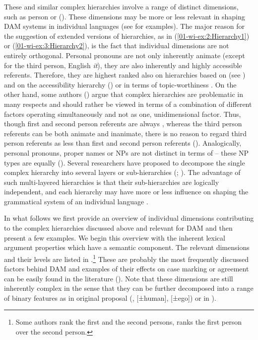 \documentclass[output=paper]{LSP/langsci}
\begin{document}
\noindent These and similar complex hierarchies involve a range of distinct dimensions, such as \eg person or  (\cf \citealt[130]{Croft2003Typology}). 
These dimensions may be more or less relevant in shaping DAM systems in individual languages (see \citealt{Aissen1999Markedness} for examples). 
The major reason for the suggestion of extended versions of hierarchies, as in (\ref{01-wi-ex:2:Hierarchy1}) or (\ref{01-wi-ex:3:Hierarchy2}), is the fact that individual dimensions are not entirely orthogonal. 
Personal pronouns are not only inherently animate (except for the third person, \cf English \textit{it}), they are also inherently  and highly accessible referents. Therefore, they are highest ranked also on hierarchies based on  (see ) and on the accessibility hierarchy (\cf \citealt{Ariel1988Referring, Ariel2001Accessibility}) or in terms of topic-worthiness \citep{Wierzbicka1981Case}. 
On the other hand, some authors (\eg \citealt{Dahl2008Animacy}) argue that complex hierarchies are problematic in many respects and should rather be viewed in terms of a combination of different factors operating simultaneously and not as one, unidimensional factor. 
Thus, though first and second person referents are always , whereas the third person referents can be both animate and inanimate, there is no reason to regard  third person referents as less  than first and second person referents (\cf \citealt[195]{Comrie1989Language}). 
Analogically, personal pronouns, proper names or  NPs are not distinct in terms of  – these NP types are equally  (\cf \citealt[45]{vonHeusingeretal2003Interaction}). 
Several researchers have proposed to decompose the single complex hierarchy into several layers or sub-hierarchies (\cf \citealt[130]{Croft2003Typology}; \citealt[149]{Siewierska2004Person}). 
The advantage of such multi-layered hierarchies is that their sub-hierarchies are logically independent, and each hierarchy may have more or less influence on shaping the grammatical system of an individual language \citep{Haudeetal2016Referential}. 

In what follows we first provide an overview of individual dimensions contributing to the complex hierarchies discussed above and relevant for DAM and then present a few examples. 
We begin this overview with the inherent lexical argument properties which have a semantic component. The relevant dimensions and their levels are listed in .\footnote{Some authors rank the first and the second persons, \eg \citet[85]{Dixon1979Ergativity} ranks the first person over the second person.} 
These are probably the most frequently discussed factors behind DAM and examples of their effects on case marking or agreement can be easily found in the literature (\eg \citealt{Silverstein1976Hierarchy, Aissen1999Markedness, Dixon1994Ergativity}). 
Note that these dimensions are still inherently complex in the sense that they can be further decomposed into a range of binary features as in  original proposal (\eg [±animate], [±human], [±ego]) or in \citealt[159]{Bossong1991Differential}).
\end{document}
